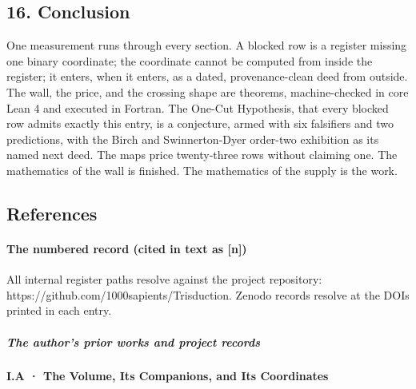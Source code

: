 \documentclass[10pt]{article}
\renewcommand{\_}{\origunderscore\allowbreak}
\begin{document}
\hypertarget{conclusion}{%
\subsection{16. Conclusion}\label{conclusion}}

One measurement runs through every section. A blocked row is a register
missing one binary coordinate; the coordinate cannot be computed from
inside the register; it enters, when it enters, as a dated,
provenance-clean deed from outside. The wall, the price, and the
crossing shape are theorems, machine-checked in core Lean 4 and executed
in Fortran. The One-Cut Hypothesis, that every blocked row admits
exactly this entry, is a conjecture, armed with six falsifiers and two
predictions, with the Birch and Swinnerton-Dyer order-two exhibition as
its named next deed. The maps price twenty-three rows without claiming
one. The mathematics of the wall is finished. The mathematics of the
supply is the work.

\hypertarget{references}{%
\subsection{References}\label{references}}

\hypertarget{the-numbered-record-cited-in-text-as-n}{%
\paragraph{The numbered record (cited in text as
{[}n{]})}\label{the-numbered-record-cited-in-text-as-n}}

All internal register paths resolve against the project repository:
https://github.com/1000sapients/Trisduction. Zenodo records resolve at
the DOIs printed in each entry.

\hypertarget{the-authors-prior-works-and-project-records}{%
\subparagraph{The author's prior works and project
records}\label{the-authors-prior-works-and-project-records}}

\hypertarget{i.a-the-volume-its-companions-and-its-coordinates}{%
\paragraph{I.A · The Volume, Its Companions, and Its
Coordinates}\label{i.a-the-volume-its-companions-and-its-coordinates}}
\end{document}
